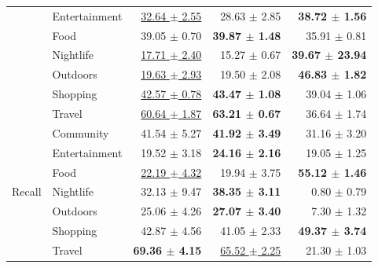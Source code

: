 \begin{table}[htbp]
\begin{tabular}{llrrr}
                           & Entertainment & \underline{32.64 $\pm$ 2.55} & 28.63 $\pm$ 2.85             & \textbf{38.72 $\pm$ 1.56} \\
                           & Food          & 39.05 $\pm$ 0.70             & \textbf{39.87 $\pm$ 1.48}    & 35.91 $\pm$ 0.81 \\
                           & Nightlife     & \underline{17.71 $\pm$ 2.40} & 15.27 $\pm$ 0.67             & \textbf{39.67 $\pm$ 23.94} \\
                           & Outdoors      & \underline{19.63 $\pm$ 2.93} & 19.50 $\pm$ 2.08             & \textbf{46.83 $\pm$ 1.82} \\
                           & Shopping      & \underline{42.57 $\pm$ 0.78} & \textbf{43.47 $\pm$ 1.08}    & 39.04 $\pm$ 1.06 \\
                           & Travel        & \underline{60.64 $\pm$ 1.87} & \textbf{63.21 $\pm$ 0.67}    & 36.64 $\pm$ 1.74 \\
\midrule
\multirow{7}{*}{Recall}    & Community     & 41.54 $\pm$ 5.27             & \textbf{41.92 $\pm$ 3.49}    & 31.16 $\pm$ 3.20 \\
                           & Entertainment & 19.52 $\pm$ 3.18             & \textbf{24.16 $\pm$ 2.16}    & 19.05 $\pm$ 1.25 \\
                           & Food          & \underline{22.19 $\pm$ 4.32} & 19.94 $\pm$ 3.75             & \textbf{55.12 $\pm$ 1.46} \\
                           & Nightlife     & 32.13 $\pm$ 9.47             & \textbf{38.35 $\pm$ 3.11}    & 0.80 $\pm$ 0.79 \\
                           & Outdoors      & 25.06 $\pm$ 4.26             & \textbf{27.07 $\pm$ 3.40}    & 7.30 $\pm$ 1.32 \\
                           & Shopping      & 42.87 $\pm$ 4.56             & 41.05 $\pm$ 2.33             & \textbf{49.37 $\pm$ 3.74} \\
                           & Travel        & \textbf{69.36 $\pm$ 4.15}    & \underline{65.52 $\pm$ 2.25} & 21.30 $\pm$ 1.03 \\
\bottomrule
\end{tabular}
\end{table}
